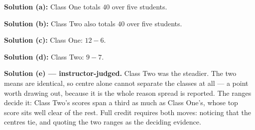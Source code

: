 \documentclass[12pt]{article}
\begin{document}

\textbf{Solution (a):} \quad Class One totals $40$ over five students. 

\textbf{Solution (b):} \quad Class Two also totals $40$ over five students. 

\textbf{Solution (c):} \quad Class One: $12 - 6$. 

\textbf{Solution (d):} \quad Class Two: $9 - 7$. 

\textbf{Solution (e) --- instructor-judged.} \quad Class Two was the steadier. The two
means are identical, so centre alone cannot separate the classes at all --- a point worth
drawing out, because it is the whole reason spread is reported. The ranges decide it: Class
Two's scores span a third as much as Class One's, whose top score sits well clear of the
rest. Full credit requires both moves: noticing that the centres tie, and quoting the two
ranges as the deciding evidence.
\end{document}
